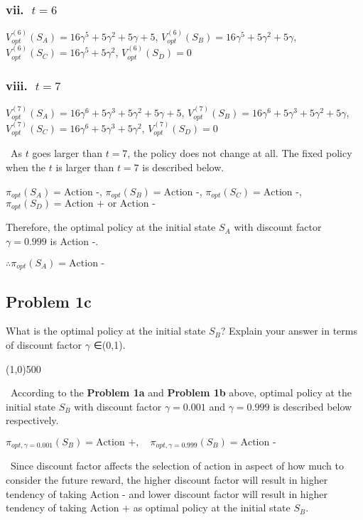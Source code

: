 \documentclass{article}
\begin{document}
\subsubsection*{vii.$\mbox{ }t=6$}
\begin{center}
    $V_{opt}^{(6)}(S_A)=16\gamma^5+5\gamma^2+5\gamma+5$,
    $V_{opt}^{(6)}(S_B)=16\gamma^5+5\gamma^2+5\gamma$,
    $V_{opt}^{(6)}(S_C)=16\gamma^5+5\gamma^2$,
    $V_{opt}^{(6)}(S_D)=0$    
\end{center}

\subsubsection*{viii.$\mbox{ }t=7$}
\begin{center}
    $V_{opt}^{(7)}(S_A)=16\gamma^6+5\gamma^3+5\gamma^2+5\gamma+5$,
    $V_{opt}^{(7)}(S_B)=16\gamma^6+5\gamma^3+5\gamma^2+5\gamma$,\\
    $V_{opt}^{(7)}(S_C)=16\gamma^6+5\gamma^3+5\gamma^2$,
    $V_{opt}^{(7)}(S_D)=0$    
\end{center}

\ As $t$ goes larger than $t=7$, the policy does not change at all. The fixed policy when the $t$ is larger than $t=7$ is described below.\\

\begin{center}
    $\pi_{opt}(S_A)=\mbox{Action -}$,
    $\pi_{opt}(S_B)=\mbox{Action -}$,
    $\pi_{opt}(S_C)=\mbox{Action -}$,
    $\pi_{opt}(S_D)=\mbox{Action + or Action -}$
\end{center}

Therefore, the optimal policy at the initial state $S_A$ with discount factor $\gamma =0.999$ is Action -.\\

\begin{center}
    $\therefore\pi_{opt}(S_A)=\mbox{Action -}$
\end{center}

\subsection*{Problem 1c}
What is the optimal policy at the initial state $S_B$? Explain your answer in terms of discount factor $\gamma$ ∈(0,1).

\begin{center}
    \line(1,0){500}
\end{center}

\ According to the \textbf{Problem 1a} and \textbf{Problem 1b} above, optimal policy at the initial state $S_B$ with discount factor $\gamma =0.001$ and $\gamma =0.999$ is described below respectively.

\begin{center}
    $\pi_{opt,\gamma=0.001}(S_B)=\mbox{Action +},\quad\pi_{opt,\gamma=0.999}(S_B)=\mbox{Action -}$
\end{center}

\ Since discount factor affects the selection of action in aspect of how much to consider the future reward, the higher discount factor will result in higher tendency of taking $\mbox{Action -}$ and lower discount factor will result in higher tendency of taking $\mbox{Action +}$ as optimal policy at the initial state $S_B$.
\end{document}
